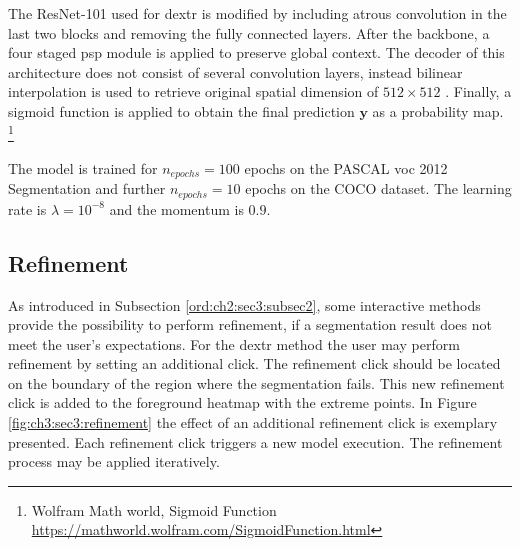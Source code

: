 The ResNet-101 used for \gls{dextr} is modified by including atrous convolution in the last two blocks and removing the fully connected layers.
After the backbone, a four staged \gls{psp} module is applied to preserve global context.
The decoder of this architecture does not consist of several convolution layers, instead bilinear interpolation is used to retrieve original spatial dimension of $512 \times 512$ .
Finally, a sigmoid function is applied to obtain the final prediction $\textbf{y}$ as a  probability map. \footnote{Wolfram Math world, Sigmoid Function \url{https://mathworld.wolfram.com/SigmoidFunction.html}}

The model is trained for $ n_{epochs} = 100 $ epochs on the PASCAL \gls{voc} 2012 Segmentation and further $ n_{epochs} = 10 $ epochs on the COCO dataset.
The learning rate is $ \lambda = 10^{-8} $ and the momentum is $ 0.9 $.


\subsection{Refinement}\label{ord:ch3:sec3:subsec4}

As introduced in Subsection \ref{ord:ch2:sec3:subsec2}, some interactive methods provide the possibility to perform refinement, if a segmentation result does not meet the user's expectations.
For the \gls{dextr} method the user may perform refinement by setting an additional click.
The refinement click should be located on the boundary of the region where the segmentation fails.
This new refinement click is added to the foreground heatmap with the extreme points.
In Figure \ref{fig:ch3:sec3:refinement} the effect of an additional refinement click is exemplary presented.
Each refinement click triggers a new model execution.
The refinement process may be applied iteratively.

